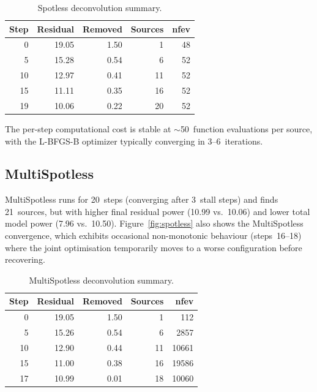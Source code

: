 \documentclass[a4paper,11pt]{article}
\begin{document}
\begin{table}[htbp]
	\centering
	\caption{Spotless deconvolution summary.}
	\label{tab:spotless}
	\begin{tabular}{rrrrr}
		\toprule
		Step & Residual & Removed & Sources & nfev \\
		\midrule
		0    & 19.05    & 1.50    & 1       & 48   \\
		5    & 15.28    & 0.54    & 6       & 52   \\
		10   & 12.97    & 0.41    & 11      & 52   \\
		15   & 11.11    & 0.35    & 16      & 52   \\
		19   & 10.06    & 0.22    & 20      & 52   \\
		\bottomrule
	\end{tabular}
\end{table}

The per-step computational cost is stable at $\sim$50~function evaluations
per source, with the L-BFGS-B optimizer typically converging in 3--6~iterations.

\subsection{MultiSpotless}

MultiSpotless runs for 20~steps (converging after 3~stall steps) and
finds 21~sources, but with higher final residual power (10.99 vs.~10.06)
and lower total model power (7.96 vs.~10.50).  Figure~\ref{fig:spotless} also
shows the MultiSpotless convergence, which exhibits occasional non-monotonic
behaviour (steps~16--18) where the joint optimisation temporarily moves to
a worse configuration before recovering.

\begin{table}[htbp]
	\centering
	\caption{MultiSpotless deconvolution summary.}
	\label{tab:multimodel}
	\begin{tabular}{rrrrr}
		\toprule
		Step & Residual & Removed & Sources & nfev  \\
		\midrule
		0    & 19.05    & 1.50    & 1       & 112   \\
		5    & 15.26    & 0.54    & 6       & 2857  \\
		10   & 12.90    & 0.44    & 11      & 10661 \\
		15   & 11.00    & 0.38    & 16      & 19586 \\
		17   & 10.99    & 0.01    & 18      & 10060 \\
		\bottomrule
	\end{tabular}
\end{table}
\end{document}
